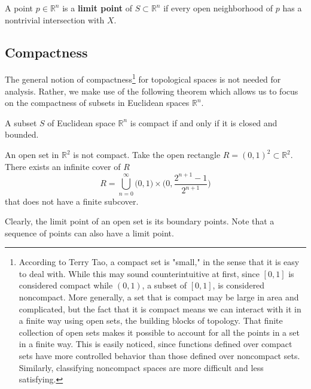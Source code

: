\documentclass{article}
\begin{document}
    \begin{definition}
      A point $p \in \mathbb{R}^n$ is a \textbf{limit point} of $S \subset \mathbb{R}^n$ if every open neighborhood of $p$ has a nontrivial intersection with $X$. 
    \end{definition}

  \subsection{Compactness}

    The general notion of compactness\footnote{According to Terry Tao, a compact set is "small," in the sense that it is easy to deal with. While this may sound counterintuitive at first, since $[0,1]$ is considered compact while $(0,1)$, a subset of $[0,1]$, is considered noncompact. More generally, a set that is compact may be large in area and complicated, but the fact that it is compact means we can interact with it in a finite way using open sets, the building blocks of topology. That finite collection of open sets makes it possible to account for all the points in a set in a finite way. This is easily noticed, since functions defined over compact sets have more controlled behavior than those defined over noncompact sets. Similarly, classifying noncompact spaces are more difficult and less satisfying. } for topological spaces is not needed for analysis. Rather, we make use of the following theorem which allows us to focus on the compactness of subsets in Euclidean spaces $\mathbb{R}^n$. 

    \begin{theorem} 
    A subset $S$ of Euclidean space $\mathbb{R}^n$ is compact if and only if it is closed and bounded. 
    \end{theorem}

    \begin{example}
      An open set in $\mathbb{R}^2$ is not compact. Take the open rectangle $ R = (0,1)^2 \subset \mathbb{R}^2$. There exists an infinite cover of $R$
      \[R = \bigcup_{n=0}^\infty \big(0,1\big) \times \bigg( 0, \frac{ 2^{n+1} - 1}{2^{n+1}} \bigg) \]
      that does not have a finite subcover. 
    \end{example}

    Clearly, the limit point of an open set is its boundary points. Note that a sequence of points can also have a limit point. 
\end{document}
